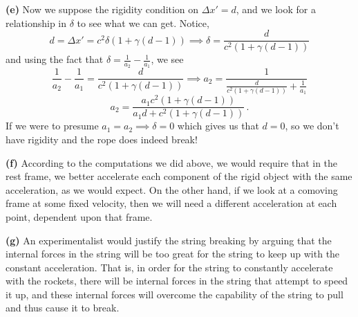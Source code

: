\documentclass[10pt]{article}
\begin{document}
\textbf{(e)} Now we suppose the rigidity condition on $\Delta x' = d$, and we look for a relationship in $\delta$ to see what we can get. Notice,
\[ d = \Delta x' = c^{2}\delta(1 + \gamma(d-1)) \implies \delta = \frac{d}{c^{2}(1+\gamma(d-1))} \]
and using the fact that $\delta = \frac{1}{a_{2}} - \frac{1}{a_{1}}$, we see
\[ \frac{1}{a_{2}} - \frac{1}{a_{1}} = \frac{d}{c^{2}(1+\gamma(d-1))} \implies a_{2} = \frac{1}{\frac{d}{c^{2}(1+\gamma(d-1))} + \frac{1}{a_{1}}}\]
\[ a_{2} = \frac{a_{1}c^{2}(1 + \gamma(d-1))}{a_{1}d + c^{2}(1+\gamma(d-1))} \, .\]
If we were to presume $a_{1} = a_{2} \implies \delta = 0$ which gives us that $d=0$, so we don't have rigidity and the rope does indeed break!

\textbf{(f)} According to the computations we did above, we would require that in the rest frame, we better accelerate each component of the rigid object with the same acceleration, as we would expect. On the other hand, if we look at a comoving frame at some fixed velocity, then we will need a different acceleration at each point, dependent upon that frame.

\textbf{(g)} An experimentalist would justify the string breaking by arguing that the internal forces in the string will be too great for the string to keep up with the constant acceleration. That is, in order for the string to constantly accelerate with the rockets, there will be internal forces in the string that attempt to speed it up, and these internal forces will overcome the capability of the string to pull and thus cause it to break. 
\end{document}
